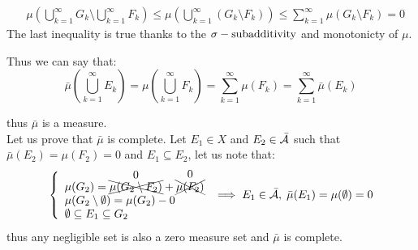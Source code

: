 \begin{itemize}
\begin{enumerate}[i)]
\begin{itemize}
\begin{align*}
                                   & \mu\left(\bigcup_{k=1}^{\infty} G_k \setminus \bigcup_{k=1}^{\infty} F_k \right) \leq \mu\left(\bigcup_{k=1}^{\infty} (G_k \setminus F_k )\right) \leq \sum_{k=1}^{\infty} \mu(G_k\setminus F_k) = 0
                              \end{align*}
                              The last inequality is true thanks to the $\sigma-\text{subadditivity}$ and monotonicty of $\mu$.
                    \end{itemize}
                    Thus we can say that:
                    \[
                        \bar{\mu}\left( \bigcup_{k=1}^{\infty} E_k \right) = \mu \left( \bigcup_{k=1}^{\infty} F_k \right) = \sum_{k=1}^{\infty} \mu(F_k) = \sum_{k=1}^{\infty} \bar{\mu}(E_k)
                    \]
          \end{enumerate}
          thus $\bar{\mu}$ is a measure.\\
          Let us prove that $\bar{\mu}$ is complete.
          Let $E_1 \in X$ and $E_2 \in \bar{\mathcal{A}}$ such that $\bar{\mu}(E_2)=\mu(F_2)=0$ and $E_1 \subseteq E_2$, let us note that:
          \[
              \left\{ \begin{array}{l}
                  \mu(G_2) = \overset{\text{\normalsize0}}{\xcancel{\mu(G_2\setminus F_2)}} + \overset{\text{\normalsize0}}{\xcancel{\mu(F_2)}}\\
                  \mu(G_2 \setminus \emptyset) = \mu(G_2) - 0                       \\
                  \emptyset \subseteq E_1 \subseteq G_2
              \end{array} \right. \implies E_1\in \bar{\mathcal{A}}, \; \bar{\mu}(E_1)=\mu(\emptyset) = 0
          \]
          thus any negligible set is also a zero measure set and $\bar{\mu}$ is complete.
\end{itemize}
